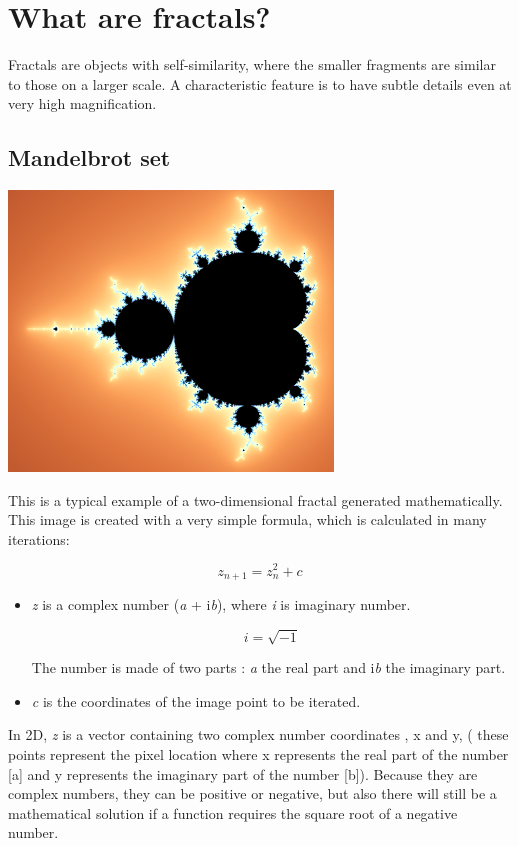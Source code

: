 \section{What are fractals?}\label{what-are-fractals}

Fractals are objects with self-similarity, where the smaller fragments are
similar to those on a larger scale. A characteristic feature is to have subtle
details even at very high magnification.

\subsection{Mandelbrot set}\label{mandelbrot-set}

\includegraphics[width=0.5\linewidth]{img/manual/media/mandelbrot_set.png}

This is a typical example of a two-dimensional fractal generated mathematically.
This image is created with a very simple formula, which is calculated in many
iterations:

\[z_{n + 1} = z_{n}^{2} + c\]

\begin{itemize}
	
	
	\item\emph{z} is a complex number (\emph{a} + i\emph{b}), where \emph{i} is
	imaginary number.
	
	\[ i = \sqrt{-1} \]
	
	The number is made of two parts : \emph{a} the real part and i\emph{b} the
	imaginary part.
	
	\item\emph{c} is the coordinates of the image point to be iterated.
\end{itemize}

In 2D, \emph{z} is a vector containing two complex number coordinates , x and y,
( these points represent the pixel location where x represents the real part of
the number {[}a{]} and y represents the imaginary part of the number {[}b{]}).
Because they are complex numbers, they can be positive or negative, but also
there will still be a mathematical solution if a function requires the square
root of a negative number.

